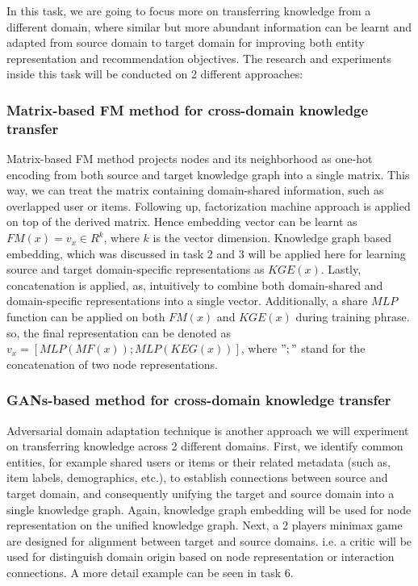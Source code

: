 In this task, we are going to focus more on transferring knowledge from a different domain, where similar but more abundant information can be learnt and adapted from source domain to target domain for improving both entity representation and recommendation objectives. The research and experiments inside this task will be conducted on 2 different approaches:

\subsubsection*{Matrix-based FM method for cross-domain knowledge transfer}
Matrix-based FM method projects nodes and its neighborhood as one-hot encoding from both source and target knowledge graph into a single matrix. This way, we can treat the matrix containing domain-shared information, such as overlapped user or items. Following up, factorization machine approach is applied on top of the derived matrix. Hence embedding vector can be learnt as $FM(x) = v_x \in R^k$, where $k$ is the vector dimension. Knowledge graph based embedding, which was discussed in task 2 and 3 will be applied here for learning source and target domain-specific representations as $KGE(x)$.
Lastly, concatenation is applied, as, intuitively to combine both domain-shared and domain-specific representations into a single vector.
Additionally, a share $MLP$ function can be applied on both $FM(x)$ and $KGE(x)$ during training phrase. so, the final representation can be denoted as $v_x = [MLP(MF(x));MLP(KEG(x))]$, where $";"$ stand for the concatenation of two node representations.

\subsubsection*{GANs-based method for cross-domain knowledge transfer}
Adversarial domain adaptation technique is another approach we will experiment on transferring knowledge across 2 different domains.
First, we identify common entities, for example shared users or items or their related metadata (such as, item labels, demographics, etc.), to establish connections between source and target domain, and consequently unifying the target and source domain into a single knowledge graph.
Again, knowledge graph embedding will be used for node representation on the unified knowledge graph. Next, a 2 players minimax game are designed for alignment between target and source domains. i.e. a critic will be used for distinguish domain origin based on node representation or interaction connections. A more detail example can be seen in task 6.


